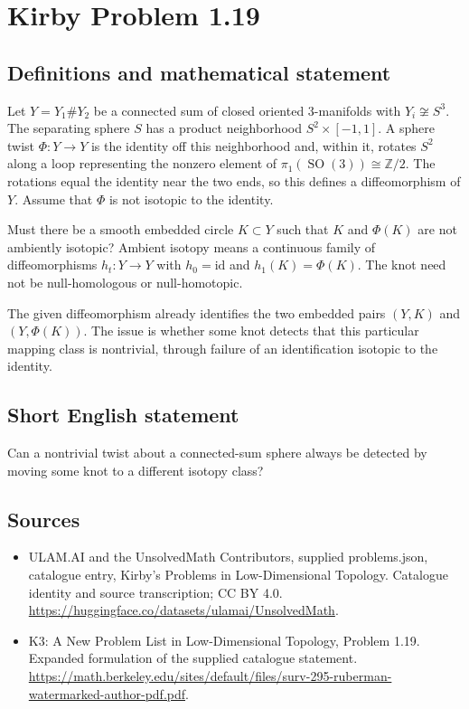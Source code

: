 \documentclass[11pt,a4paper]{article}
\begin{document}
\section*{Kirby Problem 1.19}\label{statement}

\subsection{Definitions and mathematical statement}
Let $Y=Y_1\#Y_2$ be a connected sum of closed oriented $3$-manifolds with
$Y_i\not\cong S^3$. The separating sphere $S$ has a product neighborhood
$S^2\times[-1,1]$.
A sphere twist $\Phi:Y\to Y$ is the identity off this neighborhood and, within it,
rotates $S^2$ along a loop representing the nonzero element of
$\pi_1(\operatorname{SO}(3))\cong\mathbb Z/2$. The rotations equal the identity
near the two ends, so this defines a diffeomorphism of $Y$.
Assume that $\Phi$ is not isotopic to the identity.

Must there be a smooth embedded circle $K\subset Y$ such that $K$ and $\Phi(K)$
are not ambiently isotopic? Ambient isotopy means a continuous family of
diffeomorphisms $h_t:Y\to Y$ with $h_0=\mathrm{id}$ and $h_1(K)=\Phi(K)$.
The knot need not be null-homologous or null-homotopic.

The given diffeomorphism already identifies the two embedded pairs
$(Y,K)$ and $(Y,\Phi(K))$. The issue is whether some knot detects that this
particular mapping class is nontrivial, through failure of an identification
isotopic to the identity.
\subsection{Short English statement}
Can a nontrivial twist about a connected-sum sphere always be detected by moving some knot to a different isotopy class?
\subsection{Sources}
\begin{itemize}
\item[S1] ULAM.AI and the UnsolvedMath Contributors, supplied problems.json, catalogue entry, Kirby's Problems in Low-Dimensional Topology. Catalogue identity and source transcription; CC BY 4.0.
\url{https://huggingface.co/datasets/ulamai/UnsolvedMath}.
\item[S2] K3: A New Problem List in Low-Dimensional Topology, Problem 1.19. Expanded formulation of the supplied catalogue statement.
\url{https://math.berkeley.edu/sites/default/files/surv-295-ruberman-watermarked-author-pdf.pdf}.
\end{itemize}
\end{document}
